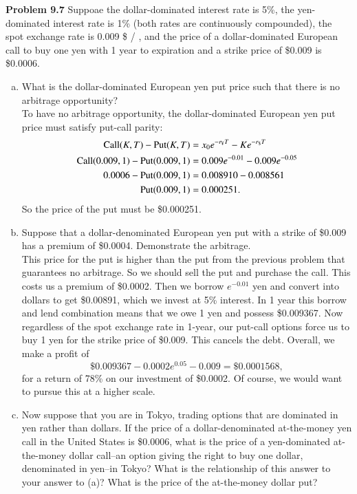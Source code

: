 \documentclass[12pt]{article}
\newcommand{\problem}[1]{\bigskip \noindent \textbf{Problem #1}}
\newcommand{\Call}{\text{Call}}
\newcommand{\Put}{\text{Put}}
\newcommand{\y}{\text{\textyen}}
\theoremstyle{plain}
\begin{document}
\problem{9.7} Suppoae the dollar-dominated interest rate is 5\%, the yen-dominated interest rate is 1\% (both rates are continuously compounded), the spot exchange rate is 0.009 \$ / \textyen, and the price of a dollar-dominated European call to buy one yen with 1 year to expiration and a strike price of \$0.009 is \$0.0006.
\begin{enumerate}[(a)]
\item What is the dollar-dominated European yen put price such that there is no arbitrage opportunity?\\

To have no arbitrage opportunity, the dollar-dominated European yen put price must satisfy put-call parity:
\begin{align*}
\Call(K,T) - \Put(K,T) &= x_0 e^{-r_{\y}T} - Ke^{-r_{\$}T}\\
\Call(0.009,1) - \Put(0.009,1) &= 0.009e^{-0.01} - 0.009e^{-0.05}\\
0.0006 - \Put(0.009,1) &= 0.008910 - 0.008561\\
\Put(0.009,1) &= 0.000251.
\end{align*}
So the price of the put must be \$0.000251.

\item Suppose that a dollar-denominated European yen put with a strike of \$0.009 has a premium of \$0.0004. Demonstrate the arbitrage.\\

This price for the put is higher than the put from the previous problem that guarantees no arbitrage. So we should sell the put and purchase the call. This costs us a premium of \$0.0002. Then we borrow $e^{-0.01}$ yen and convert into dollars to get \$0.00891, which we invest at 5\% interest. In 1 year this borrow and lend combination means that we owe 1 yen and possess \$0.009367. Now regardless of the spot exchange rate in 1-year, our put-call options force us to buy 1 yen for the strike price of \$0.009. This cancels the debt. Overall, we make a profit of
\[
\$0.009367 - 0.0002e^{0.05} - 0.009 = \$0.0001568,
\]
for a return of 78\% on our investment of \$0.0002. Of course, we would want to pursue this at a higher scale.

\item Now suppose that you are in Tokyo, trading options that are dominated in yen rather than dollars. If the price of a dollar-denominated at-the-money yen call in the United States is \$0.0006, what is the price of a yen-dominated at-the-money dollar call--an option giving the right to buy one dollar, denominated in yen--in Tokyo? What is the relationship of this answer to your answer to (a)? What is the price of the at-the-money dollar put?\\


\end{enumerate}
\end{document}

